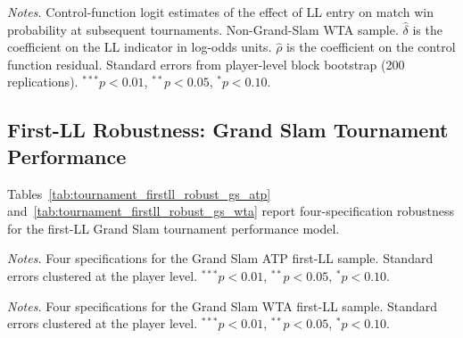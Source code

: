 \begin{table}[htbp]
\centering
\caption{Non-Grand-Slam Tournament Performance: WTA (Control Function)}
\label{tab:tournament_nongs_wta}
\begin{threeparttable}
\small

\begin{tablenotes}
\footnotesize
\item \textit{Notes.} Control-function logit estimates of the effect of LL entry on match win probability at subsequent tournaments. Non-Grand-Slam WTA sample. $\hat{\delta}$ is the coefficient on the LL indicator in log-odds units. $\hat{\rho}$ is the coefficient on the control function residual. Standard errors from player-level block bootstrap (200 replications). $^{***}p<0.01$, $^{**}p<0.05$, $^{*}p<0.10$.
\end{tablenotes}
\end{threeparttable}
\end{table}

\subsection{First-LL Robustness: Grand Slam Tournament Performance}
\label{app:firstll_tournament_robust}

Tables~\ref{tab:tournament_firstll_robust_gs_atp} and~\ref{tab:tournament_firstll_robust_gs_wta} report four-specification robustness for the first-LL Grand Slam tournament performance model.

\begin{table}[htbp]
\centering
\caption{Grand Slam Tournament Robustness: ATP (First-LL, Four Specifications)}
\label{tab:tournament_firstll_robust_gs_atp}
\begin{threeparttable}
\small

\begin{tablenotes}
\footnotesize
\item \textit{Notes.} Four specifications for the Grand Slam ATP first-LL sample. Standard errors clustered at the player level. $^{***}p<0.01$, $^{**}p<0.05$, $^{*}p<0.10$.
\end{tablenotes}
\end{threeparttable}
\end{table}

\begin{table}[htbp]
\centering
\caption{Grand Slam Tournament Robustness: WTA (First-LL, Four Specifications)}
\label{tab:tournament_firstll_robust_gs_wta}
\begin{threeparttable}
\small

\begin{tablenotes}
\footnotesize
\item \textit{Notes.} Four specifications for the Grand Slam WTA first-LL sample. Standard errors clustered at the player level. $^{***}p<0.01$, $^{**}p<0.05$, $^{*}p<0.10$.
\end{tablenotes}
\end{threeparttable}
\end{table}

